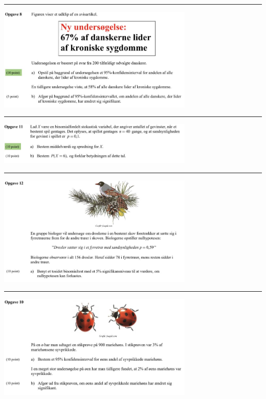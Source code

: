 \begin{center}
	\hrule
	\includegraphics[width=0.7\textwidth]{Billeder/eksamensopgstat/opg5m}
	\hrule
	\includegraphics[width=0.7\textwidth]{Billeder/eksamensopgstat/opg6m}
	\hrule
	\includegraphics[width=0.7\textwidth]{Billeder/eksamensopgstat/opg7m}
	\hrule
	\includegraphics[width=0.7\textwidth]{Billeder/eksamensopgstat/opg8m}
\end{center}
